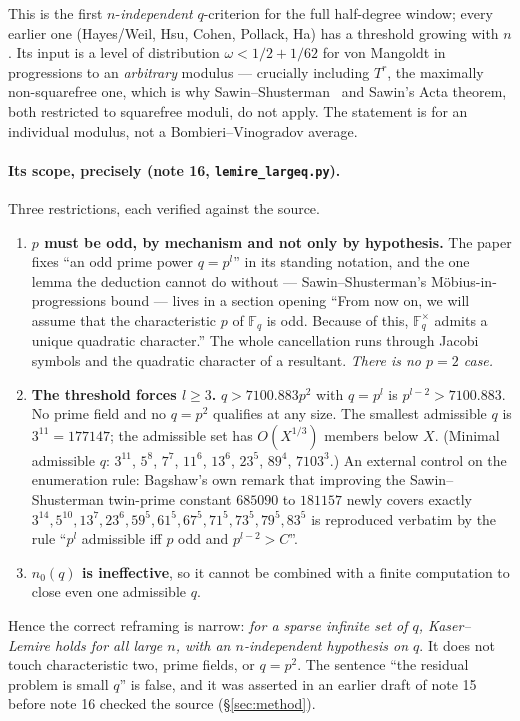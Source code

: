 \documentclass[10pt]{article}
\theoremstyle{plain}
\theoremstyle{definition}
\newcommand{\F}{\mathbb F}
\begin{document}
This is the first $n$-\emph{independent} $q$-criterion for the full half-degree
window; every earlier one (Hayes/Weil, Hsu, Cohen, Pollack, Ha) has a threshold
growing with $n$. Its input is a level of distribution $\omega<1/2+1/62$ for
von Mangoldt in progressions to an \emph{arbitrary} modulus --- crucially
including $T^r$, the maximally non-squarefree one, which is why
Sawin--Shusterman~\cite{SS22} and Sawin's Acta theorem, both restricted to
squarefree moduli, do not apply. The statement is for an individual modulus,
not a Bombieri--Vinogradov average.

\paragraph{Its scope, precisely (note 16, \texttt{lemire\_largeq.py}).}
Three restrictions, each verified against the source.
\begin{enumerate}[label=(\arabic*)]
\item \textbf{$p$ must be odd, by mechanism and not only by hypothesis.} The
paper fixes ``an odd prime power $q=p^{l}$'' in its standing notation, and the
one lemma the deduction cannot do without --- Sawin--Shusterman's
M\"obius-in-progressions bound --- lives in a section opening ``From now on, we
will assume that the characteristic $p$ of $\F_q$ is odd. Because of this,
$\F_q^{\times}$ admits a unique quadratic character.'' The whole cancellation
runs through Jacobi symbols and the quadratic character of a resultant.
\emph{There is no $p=2$ case.}
\item \textbf{The threshold forces $l\ge3$.} $q>7100.883p^2$ with $q=p^l$ is
$p^{l-2}>7100.883$. No prime field and no $q=p^2$ qualifies at any size. The
smallest admissible $q$ is $3^{11}=177147$; the admissible set has $O(X^{1/3})$
members below $X$. (Minimal admissible $q$: $3^{11}$, $5^8$, $7^7$, $11^6$,
$13^6$, $23^5$, $89^4$, $7103^3$.) An external control on the enumeration rule:
Bagshaw's own remark that improving the Sawin--Shusterman twin-prime constant
$685090$ to $181157$ newly covers exactly
$3^{14},5^{10},13^7,23^6,59^5,61^5,67^5,71^5,73^5,79^5,83^5$ is reproduced
verbatim by the rule ``$p^l$ admissible iff $p$ odd and $p^{l-2}>C$''.
\item \textbf{$n_0(q)$ is ineffective}, so it cannot be combined with a finite
computation to close even one admissible $q$.
\end{enumerate}
Hence the correct reframing is narrow: \emph{for a sparse infinite set of $q$,
Kaser--Lemire holds for all large $n$, with an $n$-independent hypothesis on
$q$}. It does not touch characteristic two, prime fields, or $q=p^2$. The
sentence ``the residual problem is small $q$'' is false, and it was asserted in
an earlier draft of note 15 before note 16 checked the source
(\S\ref{sec:method}).
\end{document}
